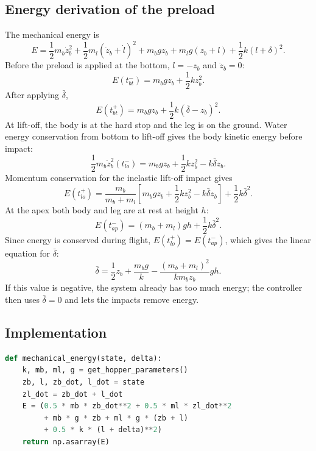 \documentclass[11pt]{article}
\begin{document}
\subsection{Energy derivation of the preload}

The mechanical energy is
\begin{equation}
E=\frac12m_b\dot z_b^2+\frac12m_l(\dot z_b+\dot l)^2
+m_bg z_b+m_lg(z_b+l)+\frac12k(l+\delta)^2 .
\end{equation}
Before the preload is applied at the bottom, $l=-z_b$ and $\dot z_b=0$:
\begin{equation}
E(t_{bt}^-)=m_bg z_b+\frac12k z_b^2 .
\end{equation}
After applying $\bar\delta$,
\begin{equation}
E(t_{bt}^+)=m_bg z_b+\frac12k(\bar\delta-z_b)^2 .
\end{equation}
At lift-off, the body is at the hard stop and the leg is on the ground.  Water
energy conservation from bottom to lift-off gives the body kinetic energy
before impact:
\begin{equation}
\frac12m_b\dot z_b^2(t_{lo}^-)
=m_bg z_b+\frac12k z_b^2-k\bar\delta z_b .
\end{equation}
Momentum conservation for the inelastic lift-off impact gives
\begin{equation}
E(t_{lo}^+)=\frac{m_b}{m_b+m_l}
\left[m_bg z_b+\frac12k z_b^2-k\bar\delta z_b\right]
+\frac12k\bar\delta^2 .
\end{equation}
At the apex both body and leg are at rest at height $h$:
\begin{equation}
E(t_{ap}^-)=(m_b+m_l)gh+\frac12k\bar\delta^2 .
\end{equation}
Since energy is conserved during flight, $E(t_{lo}^+)=E(t_{ap}^-)$, which
gives the linear equation for $\bar\delta$:
\begin{equation}
\boxed{
\bar\delta=\frac12z_b+\frac{m_bg}{k}
-\frac{(m_b+m_l)^2}{k m_b z_b}gh .
}
\end{equation}
If this value is negative, the system already has too much energy; the
controller then uses $\bar\delta=0$ and lets the impacts remove energy.

\subsection{Implementation}

\begin{lstlisting}[language=Python,caption={Mechanical energy of the hopper.}]
def mechanical_energy(state, delta):
    k, mb, ml, g = get_hopper_parameters()
    zb, l, zb_dot, l_dot = state
    zl_dot = zb_dot + l_dot
    E = (0.5 * mb * zb_dot**2 + 0.5 * ml * zl_dot**2
         + mb * g * zb + ml * g * (zb + l)
         + 0.5 * k * (l + delta)**2)
    return np.asarray(E)
\end{lstlisting}
\end{document}
